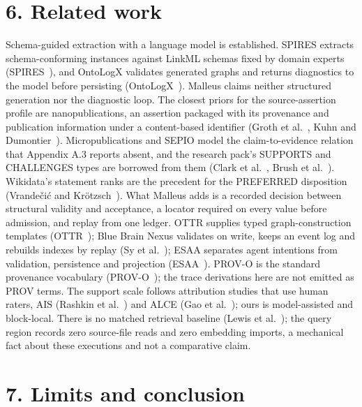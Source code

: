 \section*{6. Related work}

Schema-guided extraction with a language model is established. SPIRES extracts schema-conforming instances against LinkML schemas fixed by domain experts (SPIRES~\cite{caufield2024spires}), and OntoLogX validates generated graphs and returns diagnostics to the model before persisting (OntoLogX~\cite{cotti2026ontologx}). Malleus claims neither structured generation nor the diagnostic loop. The closest priors for the source-assertion profile are nanopublications, an assertion packaged with its provenance and publication information under a content-based identifier (Groth et al.~\cite{groth2010nanopub}, Kuhn and Dumontier~\cite{kuhn2014trusty}). Micropublications and SEPIO model the claim-to-evidence relation that Appendix A.3 reports absent, and the research pack's SUPPORTS and CHALLENGES types are borrowed from them (Clark et al.~\cite{clark2014micropub}, Brush et al.~\cite{brush2016sepio}). Wikidata's statement ranks are the precedent for the PREFERRED disposition (Vrandečić and Krötzsch~\cite{vrandecic2014wikidata}). What Malleus adds is a recorded decision between structural validity and acceptance, a locator required on every value before admission, and replay from one ledger. OTTR supplies typed graph-construction templates (OTTR~\cite{skjaeveland2024reasonable}); Blue Brain Nexus validates on write, keeps an event log and rebuilds indexes by replay (Sy et al.~\cite{sy2023nexus}); ESAA separates agent intentions from validation, persistence and projection (ESAA~\cite{santos2026esaa}). PROV-O is the standard provenance vocabulary (PROV-O~\cite{lebo2013provo}); the trace derivations here are not emitted as PROV terms. The support scale follows attribution studies that use human raters, AIS (Rashkin et al.~\cite{rashkin2023ais}) and ALCE (Gao et al.~\cite{gao2023alce}); ours is model-assisted and block-local. There is no matched retrieval baseline (Lewis et al.~\cite{lewis2020retrieval}); the query region records zero source-file reads and zero embedding imports, a mechanical fact about these executions and not a comparative claim.

\section*{7. Limits and conclusion}

